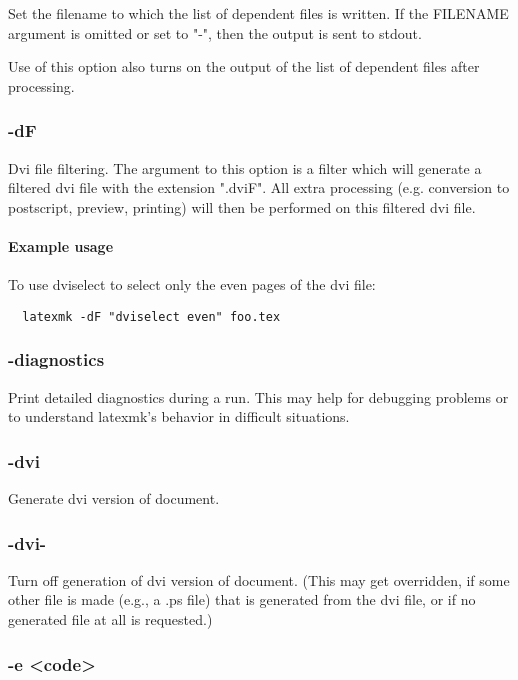 Set the filename to which the list of dependent files  is  written.   If  the
FILENAME argument is omitted or set to "-", then the output is sent to stdout.

Use of this option also turns on the output of the list  of  dependent files
after processing.

\subsubsection{-dF}

Dvi  file  filtering.   The  argument to this option is a filter which will
generate a  filtered  dvi  file  with  the  extension ".dviF".   All  extra
processing (e.g. conversion to postscript, preview, printing) will then be
performed on this  filtered  dvi file.

\paragraph{Example usage}

To use dviselect to select only the even pages of the dvi file:


\begin{verbatim}
  latexmk -dF "dviselect even" foo.tex
\end{verbatim}


\subsubsection{-diagnostics}

Print detailed diagnostics during a run.  This may help for  debugging problems
or to understand latexmk's behavior in difficult situations.

\subsubsection{-dvi}

Generate dvi version of document.

\subsubsection{-dvi-}

Turn off generation of dvi version of document.  (This  may  get
overridden,  if  some other file is made (e.g., a .ps file) that
is generated from the dvi file, or if no generated file  at  all
is requested.)


\subsubsection{-e <code>}

